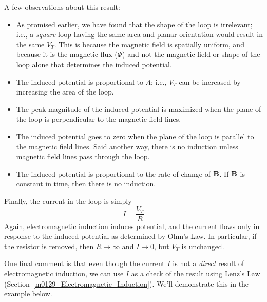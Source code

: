 A few observations about this result:  
%
\begin{itemize}
\item As promised earlier, we have found that the shape of the loop is irrelevant; i.e., a \emph{square} loop having the same area and planar orientation would result in the same $V_T$.  This is because the magnetic field is spatially uniform, and because it is the magnetic flux ($\Phi$) and not the magnetic field or shape of the loop alone that determines the induced potential. 
\item The induced potential is proportional to $A$; i.e., $V_T$ can be increased by increasing the area of the loop. 
\item The peak magnitude of the induced potential is maximized when the plane of the loop is perpendicular to the magnetic field lines.  
\item The induced potential goes to zero when the plane of the loop is parallel to the magnetic field lines.  Said another way, there is no induction unless magnetic field lines pass through the loop.   
\item The induced potential is proportional to the rate of change of ${\bf B}$.  If ${\bf B}$ is constant in time, then there is no induction.
\end{itemize}

Finally, the current in the loop is simply
%
\begin{equation}
I = \frac{V_T}{R}
\end{equation}
%
Again, electromagnetic induction induces potential, and the current flows only in response to the induced potential as determined by Ohm's Law.
In particular, if the resistor is removed, then $R\to\infty$ and $I\to0$, but $V_T$ is unchanged.

One final comment is that even though the current $I$ is not a \emph{direct} result of electromagnetic induction, we can use $I$ as a check of the result using Lenz's Law
(Section~\ref{m0129_Electromagnetic_Induction}).  We'll demonstrate this in the example below.

